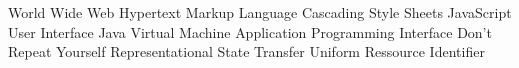 \begin{acronym}[HTML]
			{World Wide Web}
			{Hypertext Markup Language}
			{Cascading Style Sheets}
			{JavaScript}
			{User Interface}
			{Java Virtual Machine}
   			{Application Programming Interface}
	      {Don't Repeat Yourself}
	     {Representational State Transfer}
	      {Uniform Ressource Identifier}
\end{acronym}
